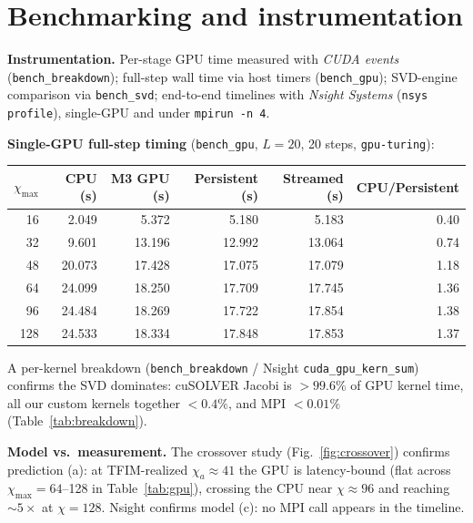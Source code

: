 \documentclass[11pt]{article}
\newcommand{\code}[1]{\texttt{#1}}
\begin{document}
\section{Benchmarking and instrumentation}\label{sec:bench}

\textbf{Instrumentation.} Per-stage GPU time measured with \textit{CUDA events} (\code{bench\_breakdown}); full-step wall time via host timers (\code{bench\_gpu});
SVD-engine comparison via \code{bench\_svd}; end-to-end timelines with \textit{Nsight Systems} (\code{nsys profile}), single-GPU and under \code{mpirun -n 4}.

\smallskip
\noindent\textbf{Single-GPU full-step timing} (\code{bench\_gpu}, $L=20$, 20 steps, \code{gpu-turing}):

\smallskip
\begin{center}\begin{tabular}{rrrrrr}
\toprule
$\chi_{\max}$ & CPU (s) & M3 GPU (s) & Persistent (s) & Streamed (s) & CPU/Persistent \\
\midrule
 16 & 2.049  & 5.372  & 5.180  & 5.183  & 0.40 \\
 32 & 9.601  & 13.196 & 12.992 & 13.064 & 0.74 \\
 48 & 20.073 & 17.428 & 17.075 & 17.079 & 1.18 \\
 64 & 24.099 & 18.250 & 17.709 & 17.745 & 1.36 \\
 96 & 24.484 & 18.269 & 17.722 & 17.854 & 1.38 \\
128 & 24.533 & 18.334 & 17.848 & 17.853 & 1.37 \\
\bottomrule
\end{tabular}
\end{center}

\smallskip
{}\label{tab:gpu}

\noindent A per-kernel breakdown (\code{bench\_breakdown} / Nsight \code{cuda\_gpu\_kern\_sum}) confirms the SVD dominates: cuSOLVER Jacobi is $>99.6\%$ of GPU kernel time, all our custom kernels together $<0.4\%$, and MPI $<0.01\%$ (Table~\ref{tab:breakdown}).

\smallskip
\textbf{Model vs.\ measurement.} The crossover study (Fig.~\ref{fig:crossover}) confirms prediction (a): at TFIM-realized $\chi_a\approx41$ the GPU is latency-bound (flat across $\chi_{\max}=64$--128 in Table~\ref{tab:gpu}), crossing the CPU near $\chi\approx96$
and reaching $\sim5\times$ at $\chi=128$. Nsight confirms model (c): no MPI call appears in the timeline.
\end{document}
